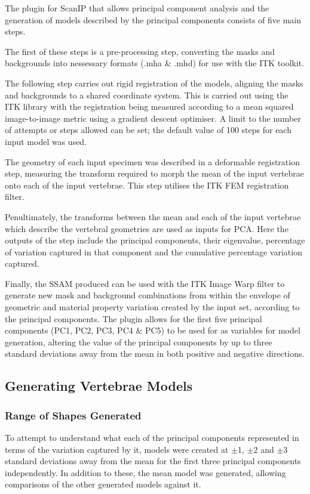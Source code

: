 The plugin for ScanIP that allows principal component analysis and the generation of models described by the principal components consists of five main steps.

The first of these steps is a pre-processing step, converting the masks and backgrounds into nessessary formats (.mha \& .mhd) for use with the ITK toolkit.

The following step carries out rigid registration of the models, aligning the masks and backgrounds to a shared coordinate system.
This is carried out using the ITK library with the registration being measured according to a mean squared image-to-image metric using a gradient descent optimiser.
A limit to the number of attempts or steps allowed can be set; the default value of 100 steps for each input model was used.

The geometry of each input specimen was described in a deformable registration step, measuring the transform required to morph the mean of the input vertebrae onto each of the input vertebrae.
This step utilises the ITK FEM registration filter.

Penultimately, the transforms between the mean and each of the input vertebrae which describe the vertebral geometries are used as inputs for PCA.
Here the outputs of the step include the principal components, their eigenvalue, percentage of variation captured in that component and the cumulative percentage variation captured.

Finally, the SSAM produced can be used with the ITK Image Warp filter to generate new mask and background combinations from within the envelope of geometric and material property variation created by the input set, according to the principal components.
The plugin allows for the first five principal components (PC1, PC2, PC3, PC4 \& PC5) to be used for as variables for model generation, altering the value of the principal components by up to three standard deviations away from the mean in both positive and negative directions.

\subsection{Generating Vertebrae Models}

\subsubsection{Range of Shapes Generated}

To attempt to understand what each of the principal components represented in terms of the variation captured by it, models were created at $\pm$1, $\pm$2 and $\pm$3 standard deviations away from the mean for the first three principal components independently.
In addition to these, the mean model was generated, allowing comparisons of the other generated models against it.

